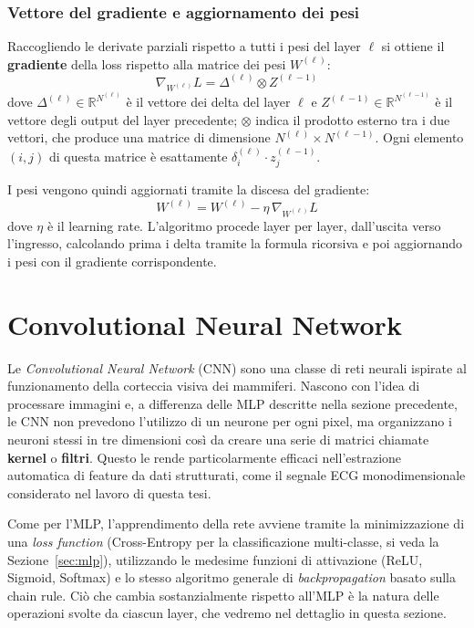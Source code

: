 \subsubsection{Vettore del gradiente e aggiornamento dei pesi}

Raccogliendo le derivate parziali rispetto a tutti i pesi del layer $\ell$ si ottiene il \textbf{gradiente} della loss rispetto alla matrice dei pesi $W^{(\ell)}$:
\[
\nabla_{W^{(\ell)}}L=\Delta^{(\ell)}\otimes Z^{(\ell-1)}
\]
dove $\Delta^{(\ell)}\in\mathbb{R}^{N^{(\ell)}}$ è il vettore dei delta del layer $\ell$ e $Z^{(\ell-1)}\in\mathbb{R}^{N^{(\ell-1)}}$ è il vettore degli output del layer precedente; $\otimes$ indica il prodotto esterno tra i due vettori, che produce una matrice di dimensione $N^{(\ell)}\times N^{(\ell-1)}$. Ogni elemento $(i,j)$ di questa matrice è esattamente $\delta_i^{(\ell)}\cdot z_j^{(\ell-1)}$.

I pesi vengono quindi aggiornati tramite la discesa del gradiente:
\[
W^{(\ell)}=W^{(\ell)}-\eta\,\nabla_{W^{(\ell)}} L
\]
dove $\eta$ è il learning rate. L'algoritmo procede layer per layer, dall'uscita verso l'ingresso, calcolando prima i delta tramite la formula ricorsiva e poi aggiornando i pesi con il gradiente corrispondente.

\section{Convolutional Neural Network}
\label{sec:cnn}

Le \emph{Convolutional Neural Network} (CNN) sono una classe di reti neurali ispirate al funzionamento della corteccia visiva dei mammiferi. Nascono con l'idea di processare immagini \cite{lecun1998gradient} e, a differenza delle MLP descritte nella sezione precedente, le CNN non prevedono l'utilizzo di un neurone per ogni pixel, ma organizzano i neuroni stessi in tre dimensioni così da creare una serie di matrici chiamate \textbf{kernel} o \textbf{filtri}. Questo le rende particolarmente efficaci nell'estrazione automatica di feature da dati strutturati, come il segnale ECG monodimensionale considerato nel lavoro di questa tesi.

Come per l'MLP, l'apprendimento della rete avviene tramite la minimizzazione di una \emph{loss function} (Cross-Entropy per la classificazione multi-classe, si veda la Sezione~\ref{sec:mlp}), utilizzando le medesime funzioni di attivazione (ReLU, Sigmoid, Softmax) e lo stesso algoritmo generale di \emph{backpropagation} basato sulla chain rule. Ciò che cambia sostanzialmente rispetto all'MLP è la natura delle operazioni svolte da ciascun layer, che vedremo nel dettaglio in questa sezione.

